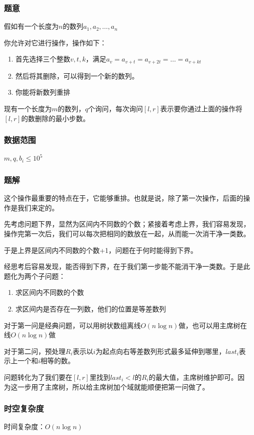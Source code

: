 \documentclass{ctexart}
\begin{document}
\subsubsection{题意}
假如有一个长度为$n$的数列$a_1,a_2,\ldots,a_n$

你允许对它进行操作，操作如下：
\begin{enumerate}
\item 首先选择三个整数$v,t,k$，满足$a_v=a_{v+t}=a_{v+2t}=\ldots=a_{v+kt}$
\item 然后将其删除，可以得到一个新的数列。
\item 你能将新数列重排
\end{enumerate}

现有一个长度为$m$的数列，$q$个询问，每次询问$[l,r]$表示要你通过上面的操作将$[l,r]$的数删除的最小步数。
\subsubsection{数据范围}
$m,q,b_i \le 10^5$
\subsubsection{题解}
这个操作最重要的特点在于，它能够重排。也就是说，除了第一次操作，后面的操作是我们来定的。

先考虑问题下界，显然为区间内不同数的个数；紧接着考虑上界，我们容易发现，操作完第一次后，我们可以每次把相同的数放在一起，从而能一次消干净一类数。

于是上界是区间内不同数的个数+1，问题在于何时能得到下界。

经思考后容易发现，能否得到下界，在于我们第一步能不能消干净一类数。于是此题化为两个子问题：

\begin{enumerate}
\item 求区间内不同数的个数
\item 求区间内是否存在一列数，他们的位置是等差数列
\end{enumerate}

对于第一问是经典问题，可以用树状数组离线$O(n \log n)$做，也可以用主席树在线$O(n \log n)$做

对于第二问，预处理$R_i$表示以$i$为起点向右等差数列形式最多延伸到哪里，$last_i$表示上一个和$i$相等的数。

问题转化为了我们要在$[l,r]$里找到$last_i<l$的$R_i$的最大值，主席树维护即可。因为这一步用了主席树，所以给主席树加个域就能顺便把第一问做了。

\subsubsection{时空复杂度}
时间复杂度：$O(n \log n)$
\end{document}
